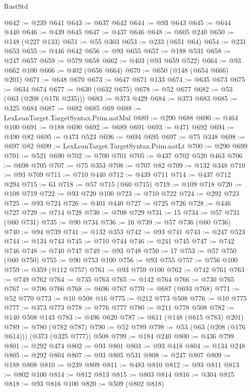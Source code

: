 \begin{lexlean}{RustStd}
\begin{coremodule}
@642 := @239 @641
@643 := @637 @642
@644 := @93 @643
@645 := @644 @440
@646 := @439 @645
@647 := @437 @646
@648 := @605 @240
@650 := @148 (@227 @133)
@651 := @55 @303
@653 := @233 (@651 @64)
@654 := @231 @653
@655 := @446 @642
@656 := @93 @655
@657 := @188 @531
@658 := @247 @657
@659 := @579 @658
@662 := @403 (@93 @659 @522)
@664 := @93 @662 @100
@666 := @402 (@656 @664)
@670 := @650 (@148 (@654 @666) @201)
@671 := @648 @670
@673 := @647 @671 @133
@674 := @635 @673
@675 := @634 @674
@677 := @630 (@632 @675)
@678 := @52 @677
@682 := @53 (@63 (@208 (@176 @235)))
@683 := @373 @429
@684 := @373 @683
@685 := @325 @684
@687 := @682 @685 @69
@688 := LexLeanTarget.TargetSyntax.Prim.natMul
@689 := @290 @688
@690 := @464 @100
@691 := @188 @690
@692 := @689 @691
@693 := @471 @692
@694 := @490 @82
@695 := @473 @523
@696 := @694 @695
@697 := @75 @348
@698 := @697 @82
@699 := LexLeanTarget.TargetSyntax.Prim.natLt
@700 := @290 @699
@701 := @521 @690
@702 := @700 @701
@705 := @437 @702 @520 @463
@706 := @698 @705
@707 := @75 @353
@708 := @707 @82
@709 := @132 @348
@710 := @93 @709
@711 := @710 @440
@712 := @439 @711
@714 := @437 @712 @294
@715 := 63
@718 := @57 @715 (@60 @715)
@719 := @109 @718
@720 := @108 @719
@722 := @93 @720 @100
@723 := @710 @722
@724 := @292 @723
@725 := @93 @724
@726 := @401 @440
@727 := @725 @726
@728 := @446 @727
@729 := @714 @728
@730 := @708 @729
@731 := 15
@734 := @57 @731 (@60 @731)
@735 := @90 @734
@736 := 16
@739 := @57 @736 (@60 @736)
@740 := @94 @739
@741 := @132 @353
@742 := @93 @741
@743 := @247 @523
@744 := @134 @743
@745 := @710 @744
@746 := @241 @745
@747 := @742 @746
@748 := @740 @747
@749 := @93 @748
@750 := 17
@753 := @57 @750 (@60 @750)
@755 := @90 @753 @100
@756 := @93 @755
@757 := @756 @100
@759 := @359 (@112 @757)
@761 := @93 @759 @100
@762 := @742 @761
@763 := @749 @762
@764 := @735 @763
@765 := @142 @764
@766 := @730 @765
@767 := @706 @766
@768 := @696 @767
@770 := @687 (@693 @768)
@771 := @52 @770
@773 := @10 @508 @16
@775 := @212 @773 @508
@776 := @10 @775
@777 := @373 @773
@778 := @776 @777
@780 := @211 @778 @508
@782 := @140 @508 @143
@783 := @496 @620
@787 := @611 (@148 (@615 @783) @201)
@789 := @780 (@782 @787)
@790 := @52 @789
@798 := @53 (@63 (@208 (@176 @614))) (@373 (@325 @777)) @508
@799 := @184 @240
@800 := @436 @799
@801 := @292 @474
@802 := @93 @801
@803 := @93 @418
@804 := @134 @248
@805 := @292 @804
@807 := @93 @805 @531
@808 := @247 @807
@809 := @188 @808
@810 := @239 @809
@811 := @483 @810
@812 := @93 @811
@813 := @802 @100
@814 := @812 @813
@815 := @803 @814
@816 := @304 @815
@818 := @93 @816 @100
@820 := @509 (@802 @818)

\end{coremodule}
\end{lexlean}
